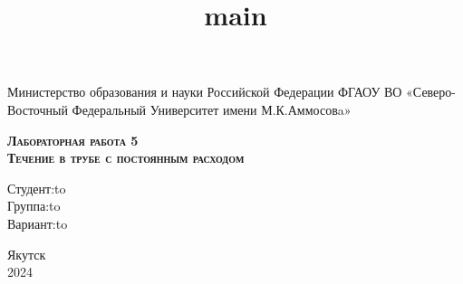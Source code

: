 \documentclass[11pt]{article}
\title{main}
\begin{document}
          \begin{titlepage}
\newpage

\begin{center}
Министерство образования и науки Российской Федерации
ФГАОУ ВО «Северо-Восточный Федеральный Университет имени М.К.Аммосовa» \\
\end{center}


\vspace{25em}

\begin{center}
\textsc{\textbf{Лабораторная работа 5}} \\
\textsc{\textbf{Течение в трубе с постоянным расходом}}
\end{center}

\vspace{20em}



\newbox{\lbox}
\newlength{\maxl}
\setlength{\maxl}{\wd\lbox}
\hfill\parbox{11cm}{
\hspace*{5cm}\hbox{Студент}:\hfill\hbox to\\
\hspace*{5cm}Группа:\hfill\hbox to\\
\hspace*{5cm}Вариант:\hfill\hbox to\\
}


\vspace{\fill}

\begin{center}
Якутск \\2024
\end{center}

\end{titlepage}  
    
\end{document}
